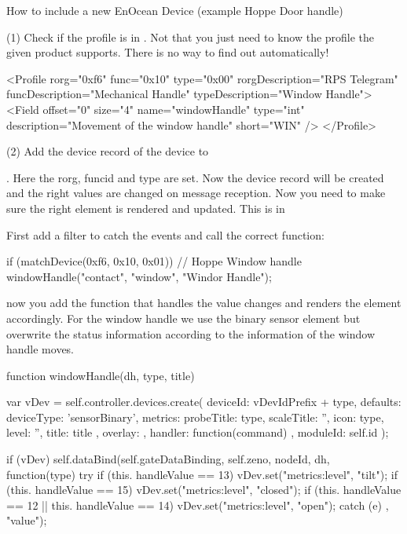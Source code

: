 How to include a new EnOcean Device (example Hoppe Door handle)

(1) Check if the profile is in . Not that 
you just need to know the profile the given product supports. There is no way 
to find out automatically! 

\begin{listingverbatim}
<Profile rorg="0xf6" func="0x10" type="0x00" rorgDescription="RPS Telegram"
    funcDescription="Mechanical Handle" typeDescription="Window Handle">
  <Field offset="0" size="4" name="windowHandle" type="int" description="Movement of the window handle" short="WIN" />
</Profile>
\end{listingverbatim}

(2) Add the device record of the device to 

{\small
{}. 
}
Here the rorg, funcid and type are set. Now the device record will be created and the 
right values are changed on message reception. Now you need to make sure the right  
element is rendered and updated. This is 
in 

First add a filter to catch the events and call the correct function:

\begin{listingverbatim}
if (matchDevice(0xf6, 0x10, 0x01)) {
  // Hoppe Window handle
  windowHandle("contact", "window", "Windor Handle");
}
\end{listingverbatim}
now you add the function that handles the value changes and renders the element 
accordingly. For the window handle we use the binary sensor element but overwrite 
the status information according to the information of the window handle moves.  

\begin{listingverbatim}
function windowHandle(dh, type, title) {
	var vDev = self.controller.devices.create({
	deviceId: vDevIdPrefix + type,
	defaults: {
		deviceType: 'sensorBinary',
		metrics: {
			probeTitle: type,
			scaleTitle: '',
			icon: type,
			level: '',
			title: title
		}
	},
	overlay: {},
	handler: function(command) {},
	moduleId: self.id
});

if (vDev) {
	self.dataBind(self.gateDataBinding, self.zeno, nodeId, dh, 
	function(type) {
		try {
			if (this. handleValue == 13)
				vDev.set("metrics:level", "tilt");
			if (this. handleValue == 15)
				vDev.set("metrics:level", "closed");
			if (this. handleValue == 12 || this. handleValue == 14)
				vDev.set("metrics:level", "open");
		} catch (e) {}
	}, "value");
}
}
\end{listingverbatim}
